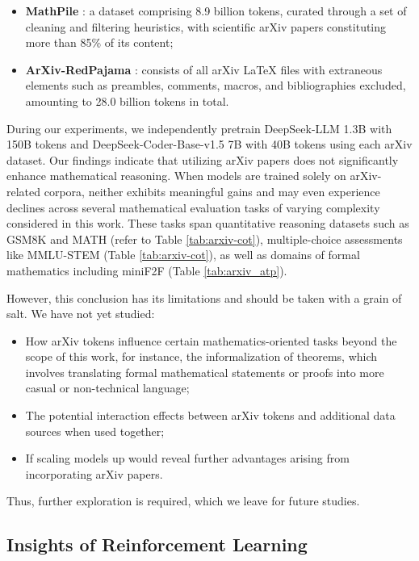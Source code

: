 \begin{itemize}[topsep=0pt]
\begin{itemize}[topsep=0pt]
\begin{itemize}[topsep=0pt]
    \item \textbf{MathPile} \citep{mathpile}: a dataset comprising 8.9 billion tokens, curated through a set of cleaning and filtering heuristics, with scientific arXiv papers constituting more than 85\% of its content;
    \item \textbf{ArXiv-RedPajama} \citep{redpajama}: consists of all arXiv LaTeX files with extraneous elements such as preambles, comments, macros, and bibliographies excluded, amounting to 28.0 billion tokens in total.
\end{itemize}

During our experiments, we independently pretrain DeepSeek-LLM 1.3B with 150B tokens and DeepSeek-Coder-Base-v1.5 7B with 40B tokens using each arXiv dataset. Our findings indicate that utilizing arXiv papers does not significantly enhance mathematical reasoning. When models are trained solely on arXiv-related corpora, neither exhibits meaningful gains and may even experience declines across several mathematical evaluation tasks of varying complexity considered in this work. These tasks span quantitative reasoning datasets such as GSM8K and MATH (refer to Table \ref{tab:arxiv-cot}), multiple-choice assessments like MMLU-STEM (Table \ref{tab:arxiv-cot}), as well as domains of formal mathematics including miniF2F (Table \ref{tab:arxiv_atp}).

However, this conclusion has its limitations and should be taken with a grain of salt. We have not yet studied:

\begin{itemize}[topsep=0pt]
    \item How arXiv tokens influence certain mathematics-oriented tasks beyond the scope of this work, for instance, the informalization of theorems, which involves translating formal mathematical statements or proofs into more casual or non-technical language;
    \item The potential interaction effects between arXiv tokens and additional data sources when used together;
    \item If scaling models up would reveal further advantages arising from incorporating arXiv papers.
\end{itemize}

Thus, further exploration is required, which we leave for future studies.

\subsection{Insights of Reinforcement Learning}

\end{itemize}
\end{itemize}

